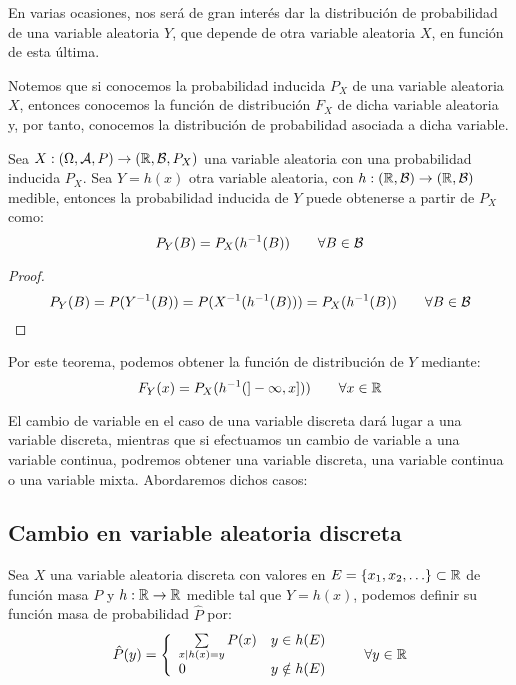 En varias ocasiones, nos será de gran interés dar la distribución de probabilidad de una variable aleatoria $Y$, que depende de otra variable aleatoria $X$, en función de esta última.

Notemos que si conocemos la probabilidad inducida $P_X$ de una variable aleatoria $X$, entonces conocemos la función de distribución $F_X$ de dicha variable aleatoria y, por tanto, conocemos la distribución de probabilidad asociada a dicha variable.

\begin{teo}
  Sea $X: (\Omega, \mathcal{A}, P) \rightarrow (\mathbb R, \mathcal{B}, P_X)$ una variable aleatoria con una probabilidad inducida $P_X$.
  Sea $Y=h(x)$ otra variable aleatoria, con $h:(\mathbb R, \mathcal{B}) \rightarrow (\mathbb R, \mathcal{B})$ medible, entonces la probabilidad inducida de $Y$ puede obtenerse a partir de $P_X$ como:
  $$P_Y(B) = P_X(h^{-1}(B)) \qquad \forall B \in \mathcal{B}$$
\end{teo}
\begin{proof}
  $$P_Y(B) = P(Y^{-1}(B)) = P(X^{-1}(h^{-1}(B))) = P_X(h^{-1}(B)) \qquad \forall B \in \mathcal{B}$$
\end{proof}

Por este teorema, podemos obtener la función de distribución de $Y$ mediante:
$$F_Y(x) = P_X(h^{-1}(]-\infty, x])) \qquad \forall x\in \mathbb R$$

El cambio de variable en el caso de una variable discreta dará lugar a una variable discreta, mientras que
si efectuamos un cambio de variable a una variable continua, podremos obtener una variable discreta, una
variable continua o una variable mixta. Abordaremos dichos casos:

\subsection{Cambio en variable aleatoria discreta}\label{subsec:CV_Discreta}

Sea $X$ una variable aleatoria discreta con valores en $E=\{x_1, x_2, \ldots\} \subset \mathbb R$ de función masa $P$
y $h:\mathbb R \rightarrow \mathbb R$ medible tal que $Y=h(x)$, podemos definir su función masa de probabilidad $\hat{P}$ por:
$$\hat{P}(y) = \left\{ \begin{array}{lc}
    \sum\limits_{x \mid h(x)=y}P(x) & y \in h(E)    \\
    0                               & y \notin h(E)
  \end{array} \right. \qquad \forall y \in \mathbb R$$


